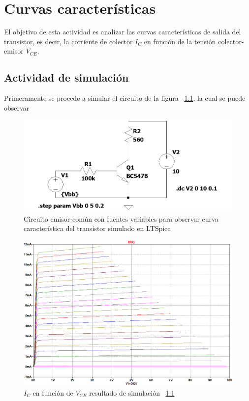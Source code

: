 \documentclass[chaptersright]{informeutn}
\begin{document}
\chapter{Curvas características}
El objetivo de esta actividad es analizar las curvas características de
salida del transistor, es decir, la corriente de colector $I_C$ en función
de la tensión colector-emisor $V_{CE}$.

  \section{Actividad de simulación}
  Primeramente se procede a simular el circuito de la figura 
  ~\ref{fig:circuito-simulacion-salida}, la cual se puede observar 
      \begin{figure}[H]
          \centering
          \includegraphics[width=1\textwidth, keepaspectratio]{pictures/circuito-simulacion-salida.png}
          \caption{Circuito emisor-común con fuentes variables para observar curva característica del transistor simulado en LTSpice}
          \label{fig:circuito-simulacion-salida}
      \end{figure}
  
      \begin{figure}[H]
          \centering
          \includegraphics[width=1\textwidth, keepaspectratio]{pictures/curva-simulacion-salida.png}
          \caption{$I_C$ en función de $V_{CE}$ resultado de simulación 
          ~\ref{fig:circuito-simulacion-salida}}
      \end{figure}
\end{document}
